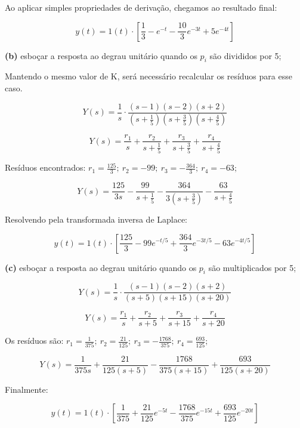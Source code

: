 \documentclass{article}
\begin{document}
Ao aplicar simples propriedades de derivação, chegamos ao resultado final:

\[ y(t) = 1(t) \cdot \left[ \frac{1}{3} - e^{-t} - \frac{10}{3} e^{-3t} + 5e^{-4t} \right] \]

\vspace{\baselineskip}

\textbf{(b)} esboçar a resposta ao degrau unitário quando os $p_i$ são divididos por 5;

Mantendo o mesmo valor de K, será necessário recalcular os resíduos para esse caso.

\[ Y(s) = \frac{1}{s} \cdot \frac{(s-1)(s-2)(s+2)}{(s+ \frac{1}{5})(s+ \frac{3}{5})(s+ \frac{4}{5})} \]

\[ Y(s) = \frac{r_1}{s} + \frac{r_2}{s+ \frac{1}{5}} + \frac{r_3}{s+ \frac{3}{5}} + \frac{r_4}{s+ \frac{4}{5}} \]

Resíduos encontrados: $ r_1 = \frac{125}{3}; \ r_2 = -99; \ r_3 = -\frac{364}{3}; \ r_4 = -63; $

\[ Y(s) = \frac{125}{3s} - \frac{99}{s+ \frac{1}{5}} - \frac{364}{3(s+ \frac{3}{5})} - \frac{63}{s+ \frac{4}{5}} \]

Resolvendo pela transformada inversa de Laplace:

\[ y(t) = 1(t) \cdot \left[ \frac{125}{3} - 99e^{-t/5} + \frac{364}{3}e^{-3t/5} - 63e^{-4t/5} \right] \]


\vspace{\baselineskip}

\textbf{(c)} esboçar a resposta ao degrau unitário quando os $p_i$ são multiplicados por 5;

\[ Y(s) = \frac{1}{s} \cdot \frac{(s-1)(s-2)(s+2)}{(s+5)(s+15)(s+20)} \]

\[ Y(s) = \frac{r_1}{s} + \frac{r_2}{s+5} + \frac{r_3}{s+15} + \frac{r_4}{s+20} \]

\vspace{\baselineskip}

Os resíduos são: $ r_1 = \frac{1}{375}; \ r_2 = \frac{21}{125}; \ r_3 = -\frac{1768}{375}; \ r_4 = \frac{693}{125}; $

\[ Y(s) = \frac{1}{375s} + \frac{21}{125(s+5)} - \frac{1768}{375(s+15)} + \frac{693}{125(s+20)} \]

\vspace{\baselineskip}

Finalmente:

\[ y(t) = 1(t) \cdot \left[ \frac{1}{375} + \frac{21}{125}e^{-5t} - \frac{1768}{375}e^{-15t} + \frac{693}{125}e^{-20t} \right] \]
\end{document}
